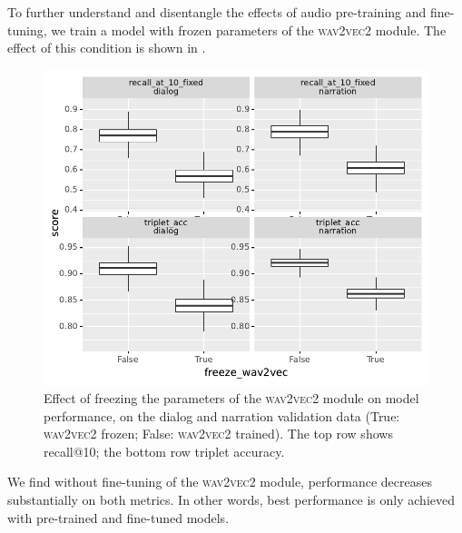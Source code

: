 To further understand and disentangle the effects of audio pre-training and 
fine-tuning, we train a model with frozen parameters of the 
\textsc{wav2vec2} module. The effect of this condition is shown in .
\begin{figure}[htb]
  \centering
  \includegraphics[width=\columnwidth]{results/ablations/freeze_wav2vec.pdf}
  \caption{Effect of freezing the parameters of the \textsc{wav2vec2}
    module on model performance, on the dialog and narration
    validation data (True: \textsc{wav2vec2} frozen; False:
    \textsc{wav2vec2} trained). The top row
    shows recall@10; the bottom row triplet accuracy.}
  \label{fig:freeze_wav2vec}
\end{figure}
We find without fine-tuning of the \textsc{wav2vec2} module, performance 
decreases substantially 
on both metrics. In other words, best performance is only achieved with pre-trained and 
fine-tuned models.



